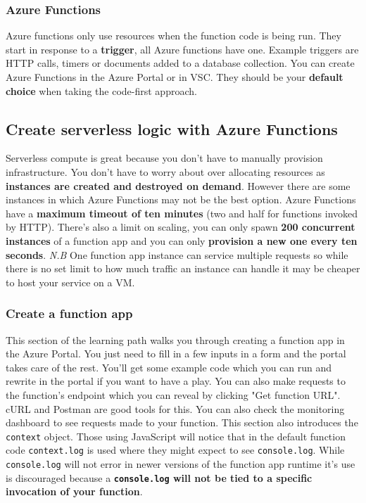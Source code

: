 \documentclass{article}
\newcommand{\code}{\texttt}
\begin{document}
\subsubsection{Azure Functions}
Azure functions only use resources when the function code is being run. They start in response to a \textbf{trigger}, all Azure functions have one. Example triggers are HTTP calls, timers or documents added to a database collection. You can create Azure Functions in the Azure Portal or in VSC. They should be your \textbf{default choice} when taking the code-first approach.

\subsection{Create serverless logic with Azure Functions}
Serverless compute is great because you don't have to manually provision infrastructure. You don't have to worry about over allocating resources as \textbf{instances are created and destroyed on demand}. However there are some instances in which Azure Functions may not be the best option. Azure Functions have a \textbf{maximum timeout of ten minutes} (two and half for functions invoked by HTTP). There's also a limit on scaling, you can only spawn \textbf{200 concurrent instances} of a function app and you can only \textbf{provision a new one every ten seconds}. \textit{N.B} One function app instance can service multiple requests so while there is no set limit to how much traffic an instance can handle it may be cheaper to host your service on a VM.

\subsubsection{Create a function app}
This section of the learning path walks you through creating a function app in the Azure Portal. You just need to fill in a few inputs in a form and the portal takes care of the rest. You'll get some example code which you can run and rewrite in the portal if you want to have a play. You can also make requests to the function's endpoint which you can reveal by clicking "Get function URL". cURL and Postman are good tools for this. You can also check the monitoring dashboard to see requests made to your function. This section also introduces the \code{context} object. Those using JavaScript will notice that in the default function code \code{context.log} is used where they might expect to see \code{console.log}. While \code{console.log} will not error in newer versions of the function app runtime it's use is discouraged because a \textbf{\code{console.log} will not be tied to a specific invocation of your function}. 
\end{document}
